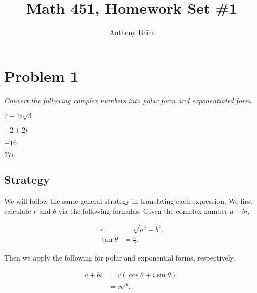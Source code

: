 \documentclass{tufte-handout}
\title{Math 451, Homework Set \#1}
\author{Anthony Brice}
\begin{document}
\maketitle

\section{Problem 1}

\begin{description}
\item \textit{Convert the following complex numbers into polar form
    and exponentiated form.}
\item[(a)] $7 + 7i\sqrt{3}$
\item[(b)] $-2 + 2i$
\item[(c)] $-16$
\item[(d)] $27i$
\end{description}

\subsection{Strategy}

We will follow the same general strategy in translating each
expression. We first calculate $r$ and $\theta$ via the following
formulas. Given the complex number $a + bi$,

\begin{align*}
  r &= \sqrt{a^2 + b^2}.\\
  \tan \theta &= \frac{a}{b}.
\end{align*}

Then we apply the following for polar and exponential forms, respectively.

\begin{align*}
  a + bi &= r \left( \cos \theta + i \sin \theta \right).\\
         &= r e^{i \theta}.
\end{align*}
\end{document}
